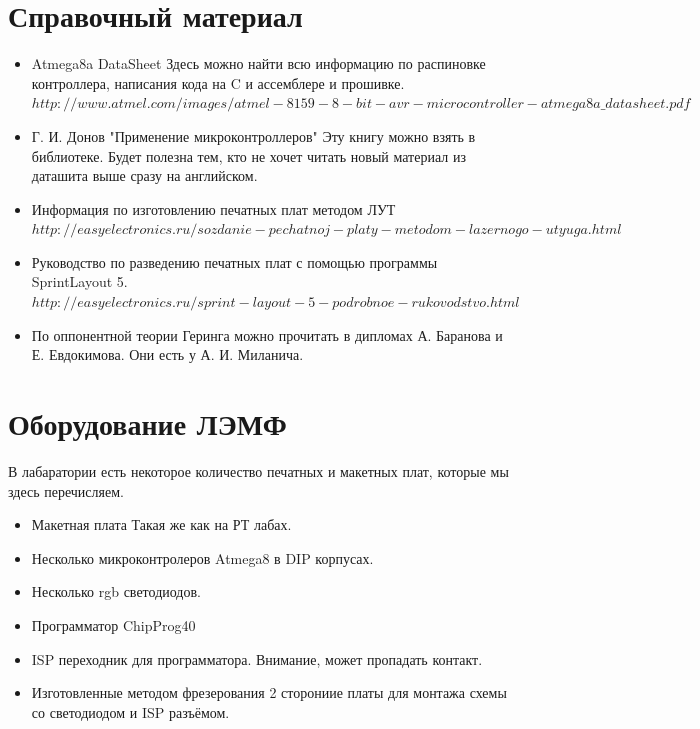 \documentclass[12pt]{article}
\begin{document}
\section{Справочный материал}
\begin{itemize}
\item Atmega8a DataSheet
\newline Здесь можно найти всю информацию по распиновке контроллера, написания кода на C и ассемблере и прошивке.
\newline $http://www.atmel.com/images/atmel-8159-8-bit-avr-microcontroller-atmega8a\_datasheet.pdf$
\item Г. И. Донов "Применение микроконтроллеров"
\newline Эту книгу можно взять в библиотеке. Будет полезна тем, кто не хочет читать новый материал из даташита выше сразу на английском.
\item Информация по изготовлению печатных плат методом ЛУТ 
\newline $http://easyelectronics.ru/sozdanie-pechatnoj-platy-metodom-lazernogo-utyuga.html$
\item Руководство по разведению печатных плат с помощью программы SprintLayout 5.
\newline $http://easyelectronics.ru/sprint-layout-5-podrobnoe-rukovodstvo.html$
\item По оппонентной теории Геринга можно прочитать в дипломах А. Баранова и Е. Евдокимова. Они есть у А. И. Миланича.
\end{itemize}

\section{Оборудование ЛЭМФ}
В лабаратории есть некоторое количество печатных и макетных плат, которые мы здесь перечисляем.
\begin{itemize}
\item Макетная плата
\newline Такая же как на РТ лабах.
\item Несколько микроконтролеров Atmega8 в DIP корпусах.
\item Несколько rgb светодиодов.
\item Программатор ChipProg40
\item ISP переходник для программатора. Внимание, может пропадать контакт.
\item Изготовленные методом фрезерования 2 сторониие платы для монтажа схемы со светодиодом и ISP разъёмом.
\end{itemize}
\newpage
\end{document}
